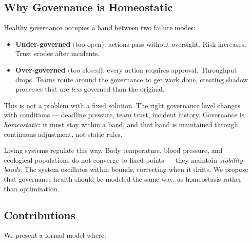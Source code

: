 \documentclass[sigconf,nonacm]{acmart}
\begin{document}
\subsection{Why Governance is Homeostatic}

Healthy governance occupies a band between two failure modes:

\begin{itemize}[leftmargin=*]
  \item \textbf{Under-governed} (too open): actions pass without oversight.
    Risk increases. Trust erodes after incidents.
  \item \textbf{Over-governed} (too closed): every action requires approval.
    Throughput drops. Teams route around the governance to get work done,
    creating shadow processes that are \emph{less} governed than the original.
\end{itemize}

This is not a problem with a fixed solution. The right governance level
changes with conditions --- deadline pressure, team trust, incident history.
Governance is \emph{homeostatic}: it must stay within a band, and that band
is maintained through continuous adjustment, not static rules.

Living systems regulate this way. Body temperature, blood pressure, and
ecological populations do not converge to fixed points --- they maintain
\emph{stability bands}. The system oscillates within bounds, correcting
when it drifts. We propose that governance health should be modeled the
same way: as homeostasis rather than optimization.

\subsection{Contributions}

We present a formal model where:
\end{document}
